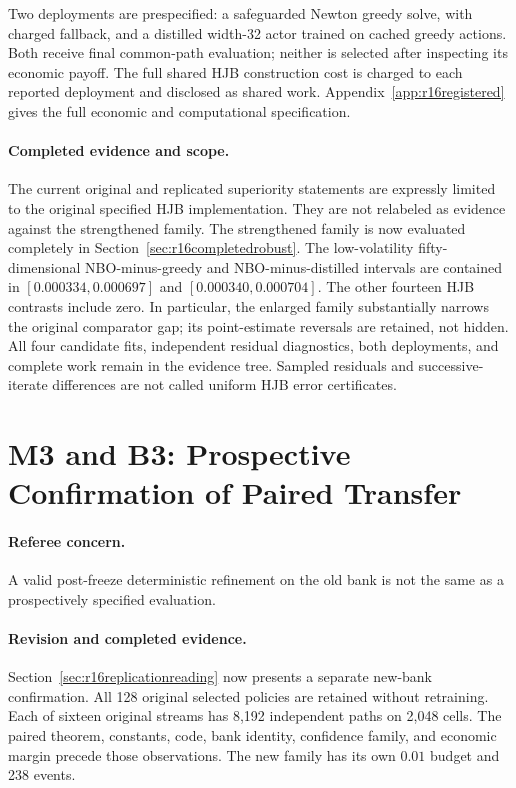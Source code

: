 Two deployments are prespecified: a safeguarded Newton greedy solve, with charged fallback, and a distilled width-32 actor trained on cached greedy actions. Both receive final common-path evaluation; neither is selected after inspecting its economic payoff. The full shared HJB construction cost is charged to each reported deployment and disclosed as shared work. Appendix~\ref{app:r16registered} gives the full economic and computational specification.

\paragraph*{Completed evidence and scope.} The current original and replicated superiority statements are expressly limited to the original specified HJB implementation. They are not relabeled as evidence against the strengthened family. The strengthened family is now evaluated completely in Section~\ref{sec:r16completedrobust}. The low-volatility fifty-dimensional NBO-minus-greedy and NBO-minus-distilled intervals are contained in $[0.000334,0.000697]$ and $[0.000340,0.000704]$. The other fourteen HJB contrasts include zero. In particular, the enlarged family substantially narrows the original comparator gap; its point-estimate reversals are retained, not hidden. All four candidate fits, independent residual diagnostics, both deployments, and complete work remain in the evidence tree. Sampled residuals and successive-iterate differences are not called uniform HJB error certificates.

\section{M3 and B3: Prospective Confirmation of Paired Transfer}
\paragraph*{Referee concern.} A valid post-freeze deterministic refinement on the old bank is not the same as a prospectively specified evaluation.

\paragraph*{Revision and completed evidence.} Section~\ref{sec:r16replicationreading} now presents a separate new-bank confirmation. All 128 original selected policies are retained without retraining. Each of sixteen original streams has 8,192 independent paths on 2,048 cells. The paired theorem, constants, code, bank identity, confidence family, and economic margin precede those observations. The new family has its own $0.01$ budget and 238 events.

